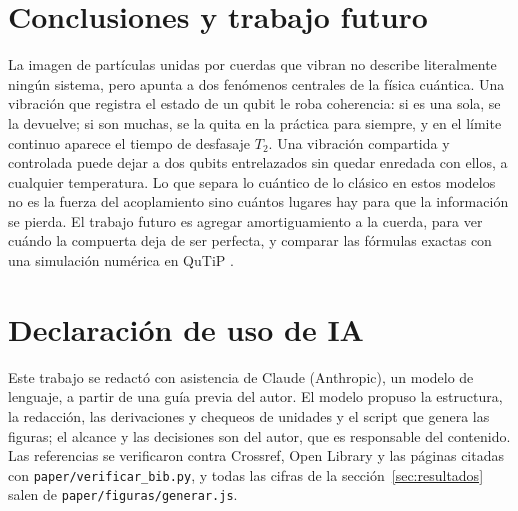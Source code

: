 \documentclass[11pt,a4paper]{article}
\begin{document}
\section{Conclusiones y trabajo futuro}\label{sec:conclusiones}

La imagen de partículas unidas por cuerdas que vibran no describe literalmente ningún sistema, pero apunta a dos fenómenos centrales de la física cuántica. Una vibración que registra el estado de un qubit le roba coherencia: si es una sola, se la devuelve; si son muchas, se la quita en la práctica para siempre, y en el límite continuo aparece el tiempo de desfasaje $T_2$. Una vibración compartida y controlada puede dejar a dos qubits entrelazados sin quedar enredada con ellos, a cualquier temperatura. Lo que separa lo cuántico de lo clásico en estos modelos no es la fuerza del acoplamiento sino cuántos lugares hay para que la información se pierda. El trabajo futuro es agregar amortiguamiento a la cuerda, para ver cuándo la compuerta deja de ser perfecta, y comparar las fórmulas exactas con una simulación numérica en QuTiP \parencite{johansson2012}.

\section*{Declaración de uso de IA}

Este trabajo se redactó con asistencia de Claude (Anthropic), un modelo de lenguaje, a partir de una guía previa del autor. El modelo propuso la estructura, la redacción, las derivaciones y chequeos de unidades y el script que genera las figuras; el alcance y las decisiones son del autor, que es responsable del contenido. Las referencias se verificaron contra Crossref, Open Library y las páginas citadas con \texttt{paper/verificar\_bib.py}, y todas las cifras de la sección~\ref{sec:resultados} salen de \texttt{paper/figuras/generar.js}.

\printbibliography
\end{document}
